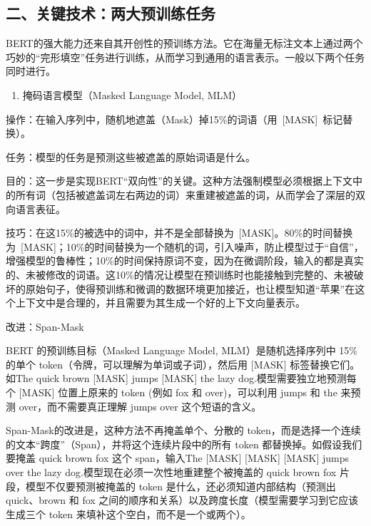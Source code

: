 \hypertarget{ux4e8cux5173ux952eux6280ux672fux4e24ux5927ux9884ux8badux7ec3ux4efbux52a1}{%
\subsection{二、关键技术：两大预训练任务}\label{ux4e8cux5173ux952eux6280ux672fux4e24ux5927ux9884ux8badux7ec3ux4efbux52a1}}

BERT的强大能力还来自其开创性的预训练方法。它在海量无标注文本上通过两个巧妙的``完形填空''任务进行训练，从而学习到通用的语言表示。一般以下两个任务同时进行。

\begin{enumerate}
\def\labelenumi{\arabic{enumi}.}
\tightlist
\item
  掩码语言模型（Masked Language Model, MLM）
\end{enumerate}

操作：在输入序列中，随机地遮盖（Mask）掉15\%的词语（用~{[}MASK{]}~标记替换）。

任务：模型的任务是预测这些被遮盖的原始词语是什么。

目的：这一步是实现BERT``双向性''的关键。这种方法强制模型必须根据上下文中的所有词（包括被遮盖词左右两边的词）来重建被遮盖的词，从而学会了深层的双向语言表征。

技巧：在这15\%的被选中的词中，并不是全部替换为~{[}MASK{]}。80\%的时间替换为~{[}MASK{]}；10\%的时间替换为一个随机的词，引入噪声，防止模型过于``自信''，增强模型的鲁棒性；10\%的时间保持原词不变，因为在微调阶段，输入的都是真实的、未被修改的词语。这10\%的情况让模型在预训练时也能接触到完整的、未被破坏的原始句子，使得预训练和微调的数据环境更加接近，也让模型知道``苹果''在这个上下文中是合理的，并且需要为其生成一个好的上下文向量表示。

改进：Span-Mask

BERT 的预训练目标（Masked Language Model, MLM）是随机选择序列中 15\% 的单个 token（令牌，可以理解为单词或子词），然后用 {[}MASK{]} 标签替换它们。如The quick brown {[}MASK{]} jumps {[}MASK{]} the lazy dog.模型需要独立地预测每个 {[}MASK{]} 位置上原来的 token (例如 fox 和 over)，可以利用 jumps 和 the 来预测 over，而不需要真正理解 jumps over 这个短语的含义。

Span-Mask的改进是，这种方法不再掩盖单个、分散的 token，而是选择一个连续的文本``跨度''（Span），并将这个连续片段中的所有 token 都替换掉。如假设我们要掩盖 quick brown fox 这个 span，输入The {[}MASK{]} {[}MASK{]} {[}MASK{]} jumps over the lazy dog.模型现在必须一次性地重建整个被掩盖的 quick brown fox 片段，模型不仅要预测被掩盖的 token 是什么，还必须知道内部结构（预测出 quick、brown 和 fox 之间的顺序和关系）以及跨度长度（模型需要学习到它应该生成三个 token 来填补这个空白，而不是一个或两个）。

